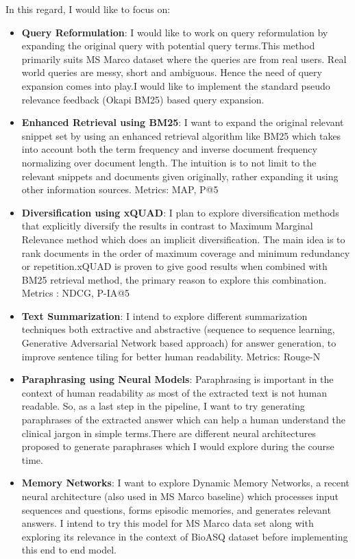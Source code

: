 \documentclass{article}
\begin{document}
In this regard, I would like to focus on:
\begin{itemize}
    \item \textbf{Query Reformulation}: I would like to work on query reformulation by expanding the original query with potential query terms.This method primarily suits MS Marco dataset where the queries are from real users. Real world queries are messy, short and ambiguous. Hence the need of query expansion comes into play.I would like to implement the standard pseudo relevance feedback (Okapi BM25) based query expansion.
    \item \textbf{Enhanced Retrieval using BM25}: I want to expand the original relevant snippet set by using an enhanced retrieval algorithm like BM25 which takes into account both the term frequency and inverse document frequency normalizing over document length. The intuition is to not limit to the relevant snippets and documents given originally, rather expanding it using other information sources.
    Metrics: MAP, P@5
    \item \textbf{Diversification using xQUAD}: I plan to explore diversification methods that explicitly diversify the results in contrast to Maximum Marginal Relevance method which does an implicit diversification. The main idea is to rank documents in the order of maximum coverage and minimum redundancy or repetition.xQUAD is proven to give good results when combined with BM25 retrieval method, the primary reason to explore this combination. 
    Metrics : NDCG, P-IA@5
    \item \textbf{Text Summarization}: I intend to explore different summarization techniques both extractive and abstractive (sequence to sequence learning, Generative Adversarial Network based approach) for answer generation, to improve sentence tiling for better human readability. Metrics: Rouge-N
    \item \textbf{Paraphrasing using Neural Models}: Paraphrasing is important in the context of human readability as most of the extracted text is not human readable. So, as a last step in the pipeline, I want to try generating paraphrases of the extracted answer which can help a human understand the clinical jargon in simple terms.There are different neural architectures proposed to generate paraphrases which I would explore during the course time.
    \item \textbf{Memory Networks}: I want to explore Dynamic Memory Networks, a recent neural architecture (also used in MS Marco baseline) which processes input sequences and questions, forms episodic memories, and generates relevant answers. I intend to try this model for MS Marco data set along with exploring its relevance in the context of BioASQ dataset before implementing this end to end model. 
\end{itemize}
\end{document}
